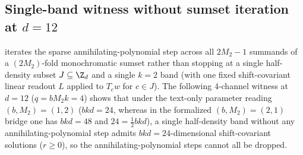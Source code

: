\subsection{Single-band witness without sumset iteration at \texorpdfstring{$d = 12$}{d = 12}}\label{sec:d12-band}

 iterates the sparse annihilating-polynomial step across all $2M_2 - 1$ summands
of a $(2M_2)$-fold monochromatic sumset rather than stopping at a single half-density subset
$J \subseteq \Z_d$ and a single $k = 2$ band (with one fixed shift-covariant linear readout $L$
applied to $T_c w$ for $c \in J$). The following $4$-channel witness at $d = 12$ ($q = b M_2 k = 4$)
shows that under the text-only parameter reading $(b, M_2) = (1, 2)$ ($bkd = 24$, whereas in the
formalized $(b, M_2) = (2, 1)$ bridge one has $bkd = 48$ and $24 = \frac{1}{2}bkd$), a single
half-density band without any annihilating-polynomial step admits $bkd = 24$-dimensional
shift-covariant solutions ($r \ge 0$), so the annihilating-polynomial steps cannot all be dropped.

